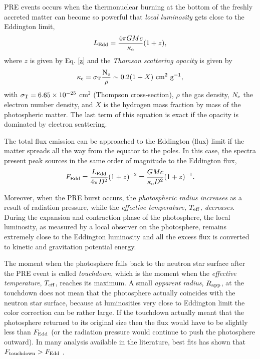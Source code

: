 {PRE events occurs when the thermonuclear burning at the bottom of the freshly accreted matter can become so powerful that  {\it local luminosity} gets close to the Eddington limit, 
\begin{equation}
L_{\rm Edd} =  \frac{4 \pi G M c}{\kappa_{\rm e}}(1+z),
\label{ledd}
\end{equation}
where $z$ is given by Eq. \ref{z} and the {\it Thomson scattering opacity} is given by
\begin{equation*}
 \kappa_{\rm e} = \sigma_{\rm T} \frac{\rm N_e}{\rho} \sim 0.2 (1 + X) \mbox{ cm}^2 \mbox{ g}^{-1},
 \label{kappa}
\end{equation*}
with $\sigma_{\rm T} = 6.65 \times 10^{-25}$ cm$^2$ (Thompson cross-section), $\rho$ the gas density, $N_{\rm e}$ the electron number density,  and $X$ is the hydrogen mass fraction by mass of the photospheric matter. The last term of this equation is exact if the opacity is dominated by electron scattering. 

\quad



The total flux emission can be approached to the Eddington (flux) limit  if the matter spreads all the way from the equator to the poles. In this case, the spectra present peak sources in the same order of magnitude to the Eddington flux,
\begin{equation}
F_{\rm Edd} = \frac{L_{\rm Edd}}{4 \pi D^2} (1+z)^{-2}= \frac{GMc}{\kappa_{\rm e} D^2} (1+z)^{-1}.
\label{fedd}
\end{equation}


\quad


Moreover, when the PRE burst occurs, the  {\it photospheric radius increases} as a result of radiation pressure, while the {\it effective temperature, $T_{\rm eff}$, decreases}.  During the expansion and contraction phase of the photosphere, the local luminosity, as measured by a local observer on the photosphere,  remains extremely close to the Eddington luminosity and all the excess flux is  converted to kinetic and gravitation potential energy. 


\quad

The moment when the photosphere falls back to the neutron star surface after the PRE event is called {\it touchdown}, which is the moment when the {\it effective temperature}, $T_{\rm eff}$,  reaches its maximum. A small {\it apparent radius}, $R_{\rm app}$, at the touchdown does not  mean that the photosphere actually coincides with the neutron star surface, because at luminosities very close to Eddington limit the color correction can be rather large. If the touchdown actually meant that the photosphere returned to its original size then the flux would have to be slightly less than $F_{\rm Edd}$ (or the radiation pressure would continue to push the photosphere outward). In many analysis available in the literature, best fits has shown  that $F_{\rm touchdown} > F_{\rm Edd}$  \cite{LAT10} \cite{LAT12}.

}
